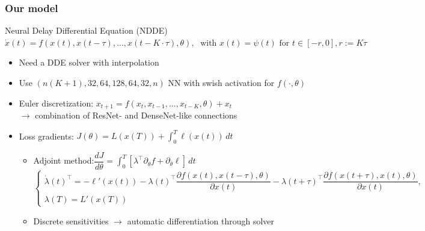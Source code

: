 \documentclass[11pt,aspectratio=169]{beamer}
\begin{document}
\begin{frame}[t]
    \frametitle{Our model}
        \begin{block}{Neural Delay Differential Equation (NDDE)}
        $\dot{x}(t) = f(x(t), x(t-\tau), ..., x(t-K\cdot\tau), \theta), \;\text{ with } x(t) = \psi(t) \text{ for } t\in [-r,0], r:=K\tau $
    \end{block}
    \begin{itemize}
        \item Need a DDE solver with interpolation
        \item Use $(n(K+1), 32, 64, 128, 64, 32, n)$ NN with swish activation for $f(\cdot,\theta)$
        \item Euler discretization:\; $x_{t+1} = f(x_t, x_{t-1},..., x_{t-K}, \theta) + x_t$\\
        $\to$ combination of ResNet- and DenseNet-like connections
        \item Loss gradients: $J(\theta) = L(x(T)) + \int_0^T \ell(x(t))\,dt$
        \begin{itemize}
            \item Adjoint method:\quad $\dfrac{dJ}{d\theta} = \int_0^T \left[\lambda^\top\partial_\theta f+\partial_\theta \ell \right]\, dt$\\\vspace{0.1cm}
            $\begin{cases}\dot{\lambda}(t)^\top = -\ell'(x(t)) - \lambda(t)^\top \dfrac{\partial f(x(t),x(t-\tau),\theta)}{\partial x(t)} - \lambda(t+\tau)^\top \dfrac{\partial f(x(t+\tau),x(t),\theta)}{\partial x(t)},\\\lambda(T)=L'(x(T))\end{cases}$\vspace{0.1cm}
            \item Discrete sensitivities $\to$ automatic differentiation through solver
        \end{itemize}
     \end{itemize}

\end{frame}

\end{document}
